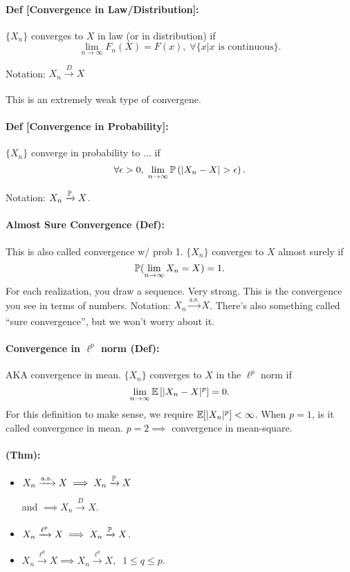\paragraph*{Def [Convergence in Law/Distribution]: } $\{X_n\}$ converges to $X$ in law (or in distribution) if 
\[ \lim\limits_{n\to\infty} F_n(X) = F(x), \; \forall \{ x | \text{$x$ is continuous} \}. \]

Notation: $X_n \xrightarrow[]{D} X$ 

This is an extremely weak type of convergene. 

\paragraph*{Def [Convergence in Probability]: } 
$\{X_n\}$ converge in probability to ... if 
\[ \forall \epsilon > 0, \; \lim\limits_{n\to\infty} \mathbb{P}\left( |X_n - X| >\epsilon \right).  \]

Notation: $X_n \xrightarrow[]{\mathbb{P}} X$. 

\paragraph*{Almost Sure Convergence (Def): } This is also called convergence w/ prob 1. $\{X_n\}$ converges to $X$ almost surely if 
\[ \mathbb{P} (\lim\limits_{n\to\infty} X_n = X) = 1 .\]
For each realization, you draw a sequence. Very strong. This is the convergence you see in terms of numbers. Notation: $X_n \xrightarrow[]{\text{a.s.}} X$. There's also something called ``sure convergence'', but we won't worry about it. 

\paragraph*{Convergence in $\ell^p$ norm (Def): } AKA convergence in mean. $\{ X_n \}$ converges to $X$ in the $\ell^p$ norm if 
\[ 
	\lim\limits_{n\to\infty} \mathbb{E}\left[ |X_n - X|^p \right] = 0.	
\]
For this definition to make sense, we require $\mathbb{E}[|X_n|^p] < \infty$. When $p=1$, is it called convergence in mean. $p=2 \implies$ convergence in mean-square. 

\paragraph*{ (Thm): } 
\begin{itemize}
	\item $X_n \xrightarrow[]{\text{a.s.}} X \implies X_n \xrightarrow[]{\mathbb{P}} X$

	and $\implies X_n \xrightarrow[]{D} X$. 
	\item $X_n \xrightarrow[]{\ell^p} X \implies X_n \xrightarrow[]{\mathbb{P}} X$. 
	\item $X_n \xrightarrow[]{\ell^p} X \implies X_n \xrightarrow[]{\ell^q} X, \;\; 1 \leq q \leq p$. 
\end{itemize}






